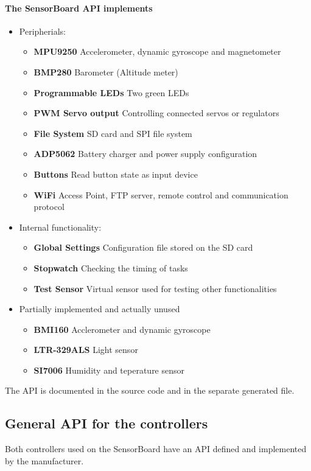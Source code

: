\paragraph{The SensorBoard API implements}
\begin{itemize}
	\item Peripherials:
	\begin{itemize}
		\item \textbf{MPU9250} Accelerometer, dynamic gyroscope and magnetometer
		\item \textbf{BMP280} Barometer (Altitude meter)
		\item \textbf{Programmable LEDs} Two green LEDs
		\item \textbf{PWM Servo output} Controlling connected servos or regulators
		\item \textbf{File System} SD card and SPI file system
		\item \textbf{ADP5062} Battery charger and power supply configuration
		\item \textbf{Buttons} Read button state as input device
		\item \textbf{WiFi} Access Point, FTP server, remote control and communication protocol
	\end{itemize}
	\item Internal functionality:
	\begin{itemize}
		\item \textbf{Global Settings} Configuration file stored on the SD card
		\item \textbf{Stopwatch} Checking the timing of tasks
		\item \textbf{Test Sensor} Virtual sensor used for testing other functionalities
	\end{itemize}
	\item Partially implemented and actually unused
	\begin{itemize}
		\item \textbf{BMI160} Acclerometer and dynamic gyroscope
		\item \textbf{LTR-329ALS} Light sensor
		\item \textbf{SI7006} Humidity and teperature sensor
	\end{itemize}
\end{itemize}

The API is documented in the source code and in the separate generated file.

\subsection{General API for the controllers}
\label{GeneralAPI}
Both controllers used on the SensorBoard have an API defined and implemented by the manufacturer.

